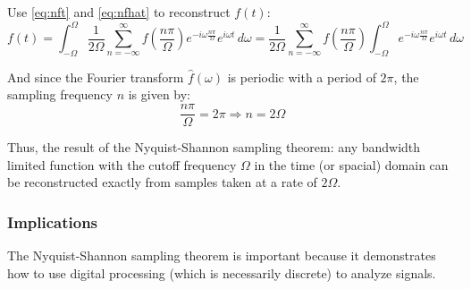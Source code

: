\documentclass[12pt]{article}
\newcommand{\inftyint}{\int_{-\infty}^{\infty}}
\begin{document}
Use \eqref{eq:nft} and \eqref{eq:nfhat} to reconstruct \( f(t)  \):
\begin{equation}
\label{eq:ndtft}
f(t) = \int_{-\Omega}^{\Omega} \frac{1}{2\Omega} \sum_{n = -\infty}^{\infty} 
f(\frac{n\pi}{\Omega})e^{-i \omega \frac{n \pi}{\Omega} } e^{i\omega t} 
\,d\omega = \frac{1}{2\Omega} \sum_{n = -\infty}^{\infty} 
f(\frac{n\pi}{\Omega}) \int_{-\Omega}^{\Omega} e^{-i \omega \frac{n 
\pi}{\Omega} } e^{i\omega t} \, d\omega
\end{equation}

And since the Fourier transform \( \hat{f}(\omega) \) is periodic with a period 
of \( 2\pi\), the sampling frequency \( n\) is given by:
\[ \frac{n\pi}{\Omega} = 2\pi \Rightarrow n = 2\Omega\]

Thus, the result of the Nyquist-Shannon sampling theorem: any bandwidth limited 
function with the cutoff frequency \( \Omega \) in the time (or spacial) domain 
can be reconstructed exactly from samples taken at a rate of \( 2\Omega \).

%
% 


\subsubsection{Implications}

The Nyquist-Shannon sampling theorem is important because it demonstrates how 
to use digital processing (which is necessarily discrete) to analyze signals. 
\end{document}
